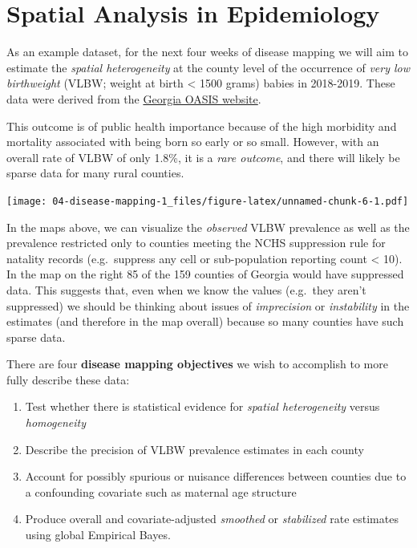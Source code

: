 \documentclass[
]{book}
\providecommand{\tightlist}{%
  \setlength{\itemsep}{0pt}\setlength{\parskip}{0pt}}
\newenvironment{rmdnote}[1]
  {
  \begin{itemize}
  \renewcommand{\labelitemi}{
    \raisebox{-.7\height}[0pt][0pt]{
      {\setkeys{Gin}{width=3em,keepaspectratio}\texttt{[image: images/\#1]}}
    }
  }
  \setlength{\fboxsep}{1em}
  \begin{note}
  \item
  }
  {
  \end{note}
  \end{itemize}
  }
\begin{document}
\hypertarget{spatial-analysis-in-epidemiology-2}{%
\section{Spatial Analysis in Epidemiology}\label{spatial-analysis-in-epidemiology-2}}

As an example dataset, for the next four weeks of disease mapping we will aim to estimate the \emph{spatial heterogeneity} at the county level of the occurrence of \emph{very low birthweight} (VLBW; weight at birth \textless{} 1500 grams) babies in 2018-2019. These data were derived from the \href{https://oasis.state.ga.us/}{Georgia OASIS website}.

This outcome is of public health importance because of the high morbidity and mortality associated with being born so early or so small. However, with an overall rate of VLBW of only 1.8\%, it is a \emph{rare outcome}, and there will likely be sparse data for many rural counties.

\texttt{[image: 04-disease-mapping-1\_files/figure-latex/unnamed-chunk-6-1.pdf]}

In the maps above, we can visualize the \emph{observed} VLBW prevalence as well as the prevalence restricted only to counties meeting the NCHS suppression rule for natality records (e.g.~suppress any cell or sub-population reporting count \textless{} 10). In the map on the right 85 of the 159 counties of Georgia would have suppressed data. This suggests that, even when we know the values (e.g.~they aren't suppressed) we should be thinking about issues of \emph{imprecision} or \emph{instability} in the estimates (and therefore in the map overall) because so many counties have such sparse data.

\begin{rmdnote}{note}

There are four \textbf{disease mapping objectives} we wish to accomplish to more fully describe these data:

\begin{enumerate}
\def\labelenumi{\arabic{enumi}.}
\tightlist
\item
  Test whether there is statistical evidence for \emph{spatial heterogeneity} versus \emph{homogeneity}
\item
  Describe the precision of VLBW prevalence estimates in each county
\item
  Account for possibly spurious or nuisance differences between counties due to a confounding covariate such as maternal age structure
\item
  Produce overall and covariate-adjusted \emph{smoothed} or \emph{stabilized} rate estimates using global Empirical Bayes.
\end{enumerate}

\end{rmdnote}
\end{document}
